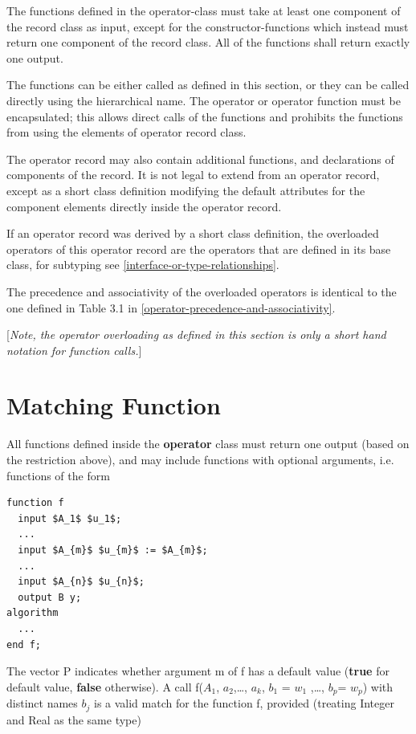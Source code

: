 \documentclass[10pt,a4paper]{report}
\def\doublelabel#1{\label{#1}}
\begin{document}
The functions defined in the operator-class must take at least one
component of the record class as input, except for the
constructor-functions which instead must return one component of the
record class. All of the functions shall return exactly one output.

The functions can be either called as defined in this section, or they
can be called directly using the hierarchical name. The operator or
operator function must be encapsulated; this allows direct calls of the
functions and prohibits the functions from using the elements of
operator record class.

The operator record may also contain additional functions, and
declarations of components of the record. It is not legal to extend from
an operator record, except as a short class definition modifying the
default attributes for the component elements directly inside the
operator record.

If an operator record was derived by a short class definition, the
overloaded operators of this operator record are the operators that are
defined in its base class, for subtyping see \ref{interface-or-type-relationships}.

The precedence and associativity of the overloaded operators is
identical to the one defined in Table 3.1 in \ref{operator-precedence-and-associativity}.

{[}\emph{Note, the operator overloading as defined in this section is
only a short hand notation for function calls.}{]}

\section{Matching Function}\doublelabel{matching-function}

All functions defined inside the \textbf{operator} class must return one
output (based on the restriction above), and may include functions with
optional arguments, i.e. functions of the form

\begin{lstlisting}[language=modelica,mathescape=true]
function f
  input $A_1$ $u_1$;
  ...
  input $A_{m}$ $u_{m}$ := $A_{m}$;
  ...
  input $A_{n}$ $u_{n}$;
  output B y;
algorithm
  ...
end f;
\end{lstlisting}
The vector P indicates whether argument m of f has a default value
(\textbf{true} for default value, \textbf{false} otherwise). A call
f($A_1$, $a_{2}$,\ldots{}, $a_{k}$,
$b_{1}$ = $w_{1}$ ,\ldots{}, $b_{p}$=
$w_{p}$) with distinct names $b_{j}$ is a valid
match for the function f, provided (treating Integer and Real as the
same type)
\end{document}
